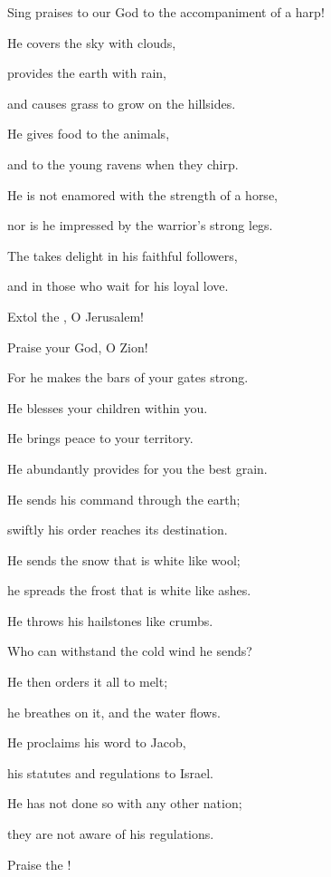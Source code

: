 {\par }{\Q Sing praises
to our God
to the accompaniment of a harp!
\par }{\Q {}He covers
the sky
with clouds,
\par }{\Q provides
the earth
with rain,
\par }{\Q and causes grass
to grow
on the hillsides.
\par }{\Q {}He gives
food
to the animals,
\par }{\Q and to the young
ravens
when they chirp.
\par }{\Q {}He
is not enamored
with the strength
of a horse,
\par }{\Q nor is he impressed by the warrior’s strong legs.
\par }{\Q {}The
{}
takes delight
in his faithful followers,
\par }{\Q and in those who wait
for his loyal love.
\par }{\Q {}Extol
the {}, O Jerusalem!
\par }{\Q Praise
your God,
O Zion!
\par }{\Q {}For
he makes the bars
of your gates
strong.
\par }{\Q He blesses
your children
within you.
\par }{\Q {}He brings
peace
to your territory.
\par }{\Q He abundantly provides
for you the best
grain.
\par }{\Q {}He sends
his command
through the earth;
\par }{\Q swiftly his order reaches
its destination.
\par }{\Q {}He sends
the snow
that is white like wool;
\par }{\Q he spreads
the frost
that is white like ashes.
\par }{\Q {}He throws
his hailstones
like crumbs.
\par }{\Q Who can
withstand
the cold wind he sends?
\par }{\Q {}He then
orders
it all to melt;

\par }{\Q he
breathes
on it, and the water
flows.
\par }{\Q {}He proclaims
his word
to Jacob,
\par }{\Q his statutes
and regulations
to Israel.
\par }{\Q {}He has not
done
so
with any
other nation;
\par }{\Q they are not
aware
of his regulations.
\par }{\Q Praise
the
{}!


}
